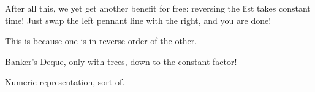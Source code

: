 \documentclass[sigconf]{acmart}
\begin{document}
After all this, we yet get another benefit for free: reversing the list takes
constant time! Just swap the left pennant line with the right, and you are done!

This is because one is in reverse order of the other.

Banker's Deque, only with trees, down to the constant factor!

Numeric representation, sort of.


\end{document}
